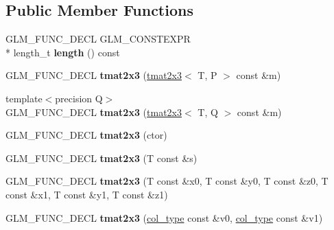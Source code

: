 \subsection*{Public Member Functions}
\begin{DoxyCompactItemize}
\item 
\hypertarget{structglm_1_1detail_1_1tmat2x3_a50b132435afbe28b35006f885138392c}{G\-L\-M\-\_\-\-F\-U\-N\-C\-\_\-\-D\-E\-C\-L G\-L\-M\-\_\-\-C\-O\-N\-S\-T\-E\-X\-P\-R \\*
length\-\_\-t {\bfseries length} () const }\label{structglm_1_1detail_1_1tmat2x3_a50b132435afbe28b35006f885138392c}

\item 
\hypertarget{structglm_1_1detail_1_1tmat2x3_a4d7107015eb343a44948415ecd5c8402}{G\-L\-M\-\_\-\-F\-U\-N\-C\-\_\-\-D\-E\-C\-L {\bfseries tmat2x3} (\hyperlink{structglm_1_1detail_1_1tmat2x3}{tmat2x3}$<$ T, P $>$ const \&m)}\label{structglm_1_1detail_1_1tmat2x3_a4d7107015eb343a44948415ecd5c8402}

\item 
\hypertarget{structglm_1_1detail_1_1tmat2x3_a7fbd232bac090da9a982bd7071d0492b}{{\footnotesize template$<$precision Q$>$ }\\G\-L\-M\-\_\-\-F\-U\-N\-C\-\_\-\-D\-E\-C\-L {\bfseries tmat2x3} (\hyperlink{structglm_1_1detail_1_1tmat2x3}{tmat2x3}$<$ T, Q $>$ const \&m)}\label{structglm_1_1detail_1_1tmat2x3_a7fbd232bac090da9a982bd7071d0492b}

\item 
\hypertarget{structglm_1_1detail_1_1tmat2x3_ab7acd9cede9ab295cdd2ce31d19f7549}{G\-L\-M\-\_\-\-F\-U\-N\-C\-\_\-\-D\-E\-C\-L {\bfseries tmat2x3} (ctor)}\label{structglm_1_1detail_1_1tmat2x3_ab7acd9cede9ab295cdd2ce31d19f7549}

\item 
\hypertarget{structglm_1_1detail_1_1tmat2x3_aee77b4e0eece78d68bf0ae3a95c520a3}{G\-L\-M\-\_\-\-F\-U\-N\-C\-\_\-\-D\-E\-C\-L {\bfseries tmat2x3} (T const \&s)}\label{structglm_1_1detail_1_1tmat2x3_aee77b4e0eece78d68bf0ae3a95c520a3}

\item 
\hypertarget{structglm_1_1detail_1_1tmat2x3_a6e7924d5ec396e17f9029f69597a7815}{G\-L\-M\-\_\-\-F\-U\-N\-C\-\_\-\-D\-E\-C\-L {\bfseries tmat2x3} (T const \&x0, T const \&y0, T const \&z0, T const \&x1, T const \&y1, T const \&z1)}\label{structglm_1_1detail_1_1tmat2x3_a6e7924d5ec396e17f9029f69597a7815}

\item 
\hypertarget{structglm_1_1detail_1_1tmat2x3_ad26d0797d1a4ef0117dfd412dde991ea}{G\-L\-M\-\_\-\-F\-U\-N\-C\-\_\-\-D\-E\-C\-L {\bfseries tmat2x3} (\hyperlink{structglm_1_1detail_1_1tvec3}{col\-\_\-type} const \&v0, \hyperlink{structglm_1_1detail_1_1tvec3}{col\-\_\-type} const \&v1)}\label{structglm_1_1detail_1_1tmat2x3_ad26d0797d1a4ef0117dfd412dde991ea}


\end{DoxyCompactItemize}
